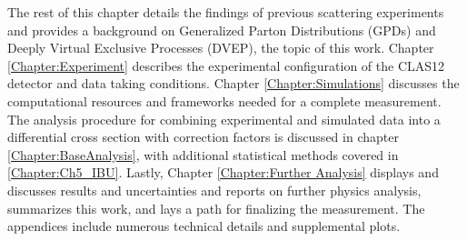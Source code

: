 The rest of this chapter details the findings of previous scattering experiments and provides a background on Generalized Parton Distributions (GPDs) and Deeply Virtual Exclusive Processes (DVEP), the topic of this work. Chapter \ref{Chapter:Experiment} describes the experimental configuration of the CLAS12 detector and data taking conditions. Chapter \ref{Chapter:Simulations} discusses the computational resources and frameworks needed for a complete \xsec measurement. The analysis procedure for combining experimental and simulated data into a differential cross section with correction factors is discussed in chapter \ref{Chapter:BaseAnalysis}, with additional statistical methods covered in \ref{Chapter:Ch5_IBU}. Lastly, Chapter \ref{Chapter:Further Analysis} displays and discusses results and uncertainties and reports on further physics analysis, summarizes this work, and lays a path for finalizing the measurement. The appendices include numerous technical details and supplemental plots. 


\clearpage



         
 

